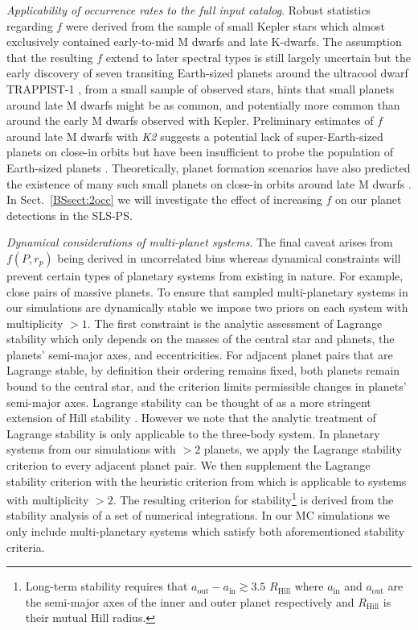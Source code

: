 \emph{Applicability of occurrence rates to the full input catalog}.
Robust statistics regarding $f$ were derived from the 
sample of small Kepler stars which almost exclusively contained early-to-mid M dwarfs and late K-dwarfs.
The assumption that the resulting $f$ extend to later spectral
types is still largely uncertain but the early discovery of seven transiting Earth-sized planets around the
ultracool dwarf TRAPPIST-1 \citep{gillon17}, from a small sample of observed stars, hints that small planets
around late M dwarfs might be as common, and potentially more common than around the early M dwarfs observed
with Kepler. Preliminary estimates of $f$ around
late M dwarfs with \emph{K2} suggests a potential lack of super-Earth-sized planets on close-in orbits but have
been insufficient to probe the population of Earth-sized planets \citep{demory16}. Theoretically,
planet formation scenarios have also predicted the existence of many such small planets on close-in orbits
around late M dwarfs \citep[e.g.][]{alibert13,alibert17}. In Sect.~\ref{BSsect:2occ} we will investigate the
effect of increasing $f$ on our planet detections in the SLS-PS.

\emph{Dynamical considerations of multi-planet systems}.
The final caveat arises from $f(P,r_p)$ being derived in uncorrelated bins whereas dynamical constraints 
will prevent certain types of planetary systems from existing in nature. For example, close pairs
of massive planets. To ensure that sampled multi-planetary systems in our simulations are dynamically stable
we impose two priors on each system with multiplicity $> 1$.
The first constraint is the analytic assessment of Lagrange
stability \citep{barnes06} which only depends on the masses of the central star and planets, the planets'
semi-major axes, and eccentricities. For adjacent planet pairs that are Lagrange stable, by definition
their ordering remains fixed, both planets remain bound to the central star, and the criterion limits 
permissible changes in planets’ semi-major axes. Lagrange stability can be thought of as a more stringent
extension of Hill stability \citep{gladman93}. However we
note that the analytic treatment of Lagrange stability is only applicable to the three-body system.
In planetary systems from our simulations with $>2$ planets, we apply the Lagrange stability criterion
to every adjacent planet pair. We then supplement the Lagrange stability
criterion with the heuristic criterion from \cite{fabrycky12} which is applicable to systems with multiplicity
$>2$. The resulting criterion for stability\footnote{Long-term stability requires that
  $a_{\text{out}} - a_{\text{in}} \gtrsim 3.5$ $R_{\text{Hill}}$ where $a_{\text{in}}$ and $a_{\text{out}}$ are the
  semi-major axes of the inner and outer planet respectively and $R_{\text{Hill}}$ is their mutual Hill radius.}
is derived from the stability analysis of a set of numerical integrations. In our MC simulations
we only include multi-planetary systems which satisfy both aforementioned stability criteria.

